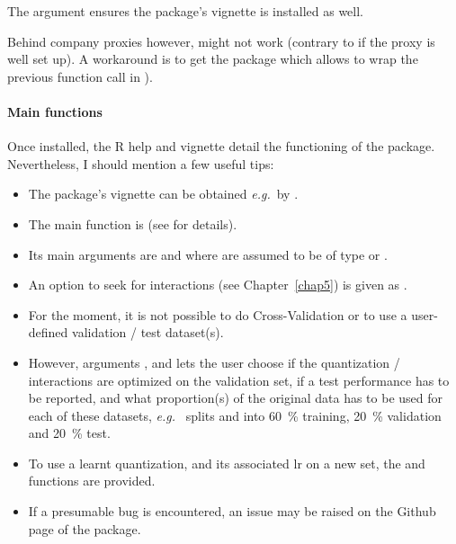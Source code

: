 The  argument ensures the package's vignette is installed as well.

Behind company proxies however,  might not work (contrary to  if the proxy is well set up). A workaround is to get the  package which allows to wrap the previous function call in ).

\paragraph{Main functions}

Once installed, the \textsf{R} help and vignette detail the functioning of the package. Nevertheless, I should mention a few useful tips:

\begin{itemize}
\item The package's vignette can be obtained \textit{e.g.}\ by .
\item The main function is  (see  for details).
\item Its main arguments are  and  where  are assumed to be of type  or .
\item An option to seek for interactions (see Chapter~\ref{chap5}) is given as .
\item For the moment, it is not possible to do Cross-Validation or to use a user-defined validation / test dataset(s).
\item However, arguments ,  and  lets the user choose if the quantization / interactions are optimized on the validation set, if a test performance has to be reported, and what proportion(s) of the original data has to be used for each of these datasets, \textit{e.g.}\  splits  and  into 60~\% training, 20~\% validation and 20~\% test.
\item To use a learnt quantization, and its associated \gls{lr} on a new set, the  and  functions are provided.
\item If a presumable bug is encountered, an issue may be raised on the Github page of the package.
\end{itemize}

